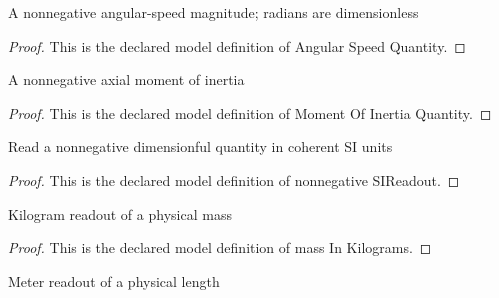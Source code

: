 \begin{definition}
  \label{def:physics:phyx-mini-0775:phyxminiproblems-problemphyxmini0775-angularspeedquantity}
  A nonnegative angular-speed magnitude; radians are dimensionless
\end{definition}
\begin{proof}
  This is the declared model definition of Angular Speed Quantity.
\end{proof}
\begin{definition}
  \label{def:physics:phyx-mini-0775:phyxminiproblems-problemphyxmini0775-momentofinertiaquantity}
  A nonnegative axial moment of inertia
\end{definition}
\begin{proof}
  This is the declared model definition of Moment Of Inertia Quantity.
\end{proof}
\begin{definition}
  \label{def:physics:phyx-mini-0775:phyxminiproblems-problemphyxmini0775-nonnegativesireadout}
  Read a nonnegative dimensionful quantity in coherent SI units
\end{definition}
\begin{proof}
  This is the declared model definition of nonnegative SIReadout.
\end{proof}
\begin{definition}
  \label{def:physics:phyx-mini-0775:phyxminiproblems-problemphyxmini0775-massinkilograms}
  Kilogram readout of a physical mass
\end{definition}
\begin{proof}
  This is the declared model definition of mass In Kilograms.
\end{proof}
\begin{definition}
  \label{def:physics:phyx-mini-0775:phyxminiproblems-problemphyxmini0775-lengthinmeters}
  Meter readout of a physical length
\end{definition}
